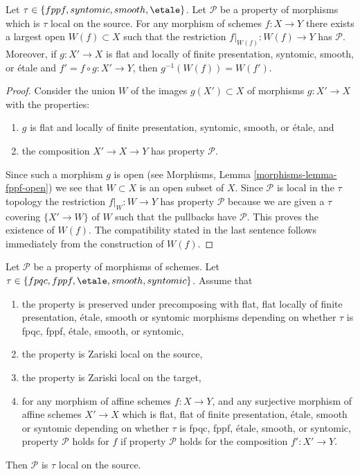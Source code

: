 \begin{lemma}
\label{lemma-largest-open-of-the-source}
Let $\tau \in \{fppf, syntomic, smooth, \etale\}$.
Let $\mathcal{P}$ be a property of morphisms which is $\tau$ local
on the source. For any morphism of schemes $f : X \to Y$ there exists
a largest open $W(f) \subset X$ such that the restriction
$f|_{W(f)} : W(f) \to Y$ has $\mathcal{P}$. Moreover,
if $g : X' \to X$ is flat and locally of finite presentation,
syntomic, smooth, or \'etale and $f' = f \circ g : X' \to Y$, then
$g^{-1}(W(f)) = W(f')$.
\end{lemma}

\begin{proof}
Consider the union $W$ of the images $g(X') \subset X$ of
morphisms $g : X' \to X$ with the properties:
\begin{enumerate}
\item $g$ is flat and locally of finite presentation, syntomic,
smooth, or \'etale, and
\item the composition $X' \to X \to Y$ has property $\mathcal{P}$.
\end{enumerate}
Since such a morphism $g$ is open (see
Morphisms, Lemma \ref{morphisms-lemma-fppf-open})
we see that $W \subset X$ is an open subset of $X$. Since $\mathcal{P}$
is local in the $\tau$ topology the restriction $f|_W : W \to Y$ has property
$\mathcal{P}$ because we are given a $\tau$ covering $\{X' \to W\}$ of $W$
such that the pullbacks have $\mathcal{P}$. This proves the existence of $W(f)$.
The compatibility stated in the last sentence follows immediately
from the construction of $W(f)$.
\end{proof}

\begin{lemma}
\label{lemma-properties-morphisms-local-source}
Let $\mathcal{P}$ be a property of morphisms of schemes.
Let $\tau \in \{fpqc, \linebreak[0] fppf, \linebreak[0]
\etale, \linebreak[0] smooth, \linebreak[0] syntomic\}$.
Assume that
\begin{enumerate}
\item the property is preserved under precomposing with
flat, flat locally of finite presentation, \'etale, smooth or syntomic morphisms
depending on whether $\tau$ is fpqc, fppf, \'etale, smooth, or syntomic,
\item the property is Zariski local on the source,
\item the property is Zariski local on the target,
\item for any morphism of affine schemes $f : X \to Y$, and
any surjective morphism of affine schemes $X' \to X$
which is flat, flat of finite presentation,
\'etale, smooth or syntomic depending on whether $\tau$ is
fpqc, fppf, \'etale, smooth, or syntomic, property
$\mathcal{P}$ holds for $f$ if property $\mathcal{P}$
holds for the composition $f' : X' \to Y$.
\end{enumerate}
Then $\mathcal{P}$ is $\tau$ local on the source.
\end{lemma}

